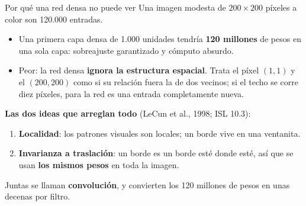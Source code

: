 \documentclass{beamer}
\newcommand{\1}{\mathbb{I}}
\begin{document}
\begin{frame}{Por qué una red densa no puede ver}
\small
Una imagen modesta de $200 \times 200$ píxeles a color son 120.000 entradas.
\pause
\begin{itemize}\itemsep3pt
  \item Una primera capa densa de 1.000 unidades tendría \textbf{120 millones} de pesos en una sola capa: sobreajuste garantizado y cómputo absurdo. \pause
  \item Peor: la red densa \textbf{ignora la estructura espacial}. Trata el píxel $(1,1)$ y el $(200,200)$ como si su relación fuera la de dos vecinos; si el techo se corre diez píxeles, para la red es una entrada completamente nueva. \pause
\end{itemize}
\vspace{0.1cm}
\textbf{Las dos ideas que arreglan todo} (LeCun et al., 1998; ISL 10.3):
\begin{enumerate}\itemsep3pt
  \item \textbf{Localidad}: los patrones visuales son locales; un borde vive en una ventanita.
  \item \textbf{Invarianza a traslación}: un borde es un borde esté donde esté, así que se usan \textbf{los mismos pesos} en toda la imagen.
\end{enumerate}
\pause
Juntas se llaman \textbf{convolución}, y convierten los 120 millones de pesos en unas decenas por filtro.
\end{frame}
\end{document}
